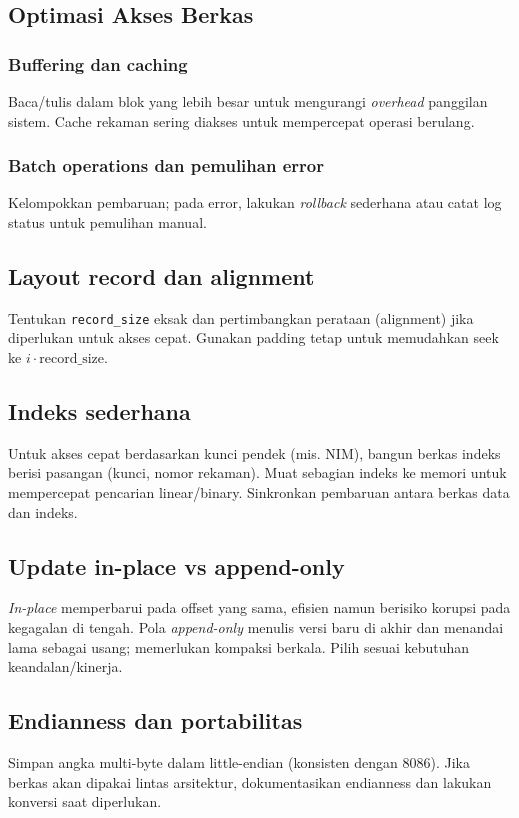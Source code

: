 \subsection{Optimasi Akses Berkas}
\subsubsection{Buffering dan caching}
Baca/tulis dalam blok yang lebih besar untuk mengurangi \textit{overhead} panggilan sistem. Cache rekaman sering diakses untuk mempercepat operasi berulang.

\subsubsection{Batch operations dan pemulihan error}
Kelompokkan pembaruan; pada error, lakukan \textit{rollback} sederhana atau catat log status untuk pemulihan manual.

\subsection{Layout record dan alignment}
Tentukan \texttt{record\_size} eksak dan pertimbangkan perataan (alignment) jika diperlukan untuk akses cepat. Gunakan padding tetap untuk memudahkan seek ke \(i\cdot \text{record\_size}\). \cite{osdev_wiki}

\subsection{Indeks sederhana}
Untuk akses cepat berdasarkan kunci pendek (mis. NIM), bangun berkas indeks berisi pasangan (kunci, nomor rekaman). Muat sebagian indeks ke memori untuk mempercepat pencarian linear/binary. Sinkronkan pembaruan antara berkas data dan indeks. \cite{osdev_wiki}

\subsection{Update in-place vs append-only}
\textit{In-place} memperbarui pada offset yang sama, efisien namun berisiko korupsi pada kegagalan di tengah. Pola \textit{append-only} menulis versi baru di akhir dan menandai lama sebagai usang; memerlukan kompaksi berkala. Pilih sesuai kebutuhan keandalan/kinerja. \cite{osdev_wiki}

\subsection{Endianness dan portabilitas}
Simpan angka multi-byte dalam little-endian (konsisten dengan 8086). Jika berkas akan dipakai lintas arsitektur, dokumentasikan endianness dan lakukan konversi saat diperlukan. \cite{wiki_endianness}


